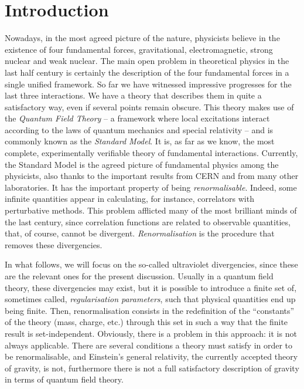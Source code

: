 \documentclass[draft]{phd}
\begin{document}
	\chapter*{Introduction}
		Nowadays, in the most agreed picture of the nature, physicists believe in the existence of four fundamental forces, gravitational, electromagnetic, strong nuclear and weak nuclear. 
		The main open problem in theoretical physics in the last half century is certainly the description of the four fundamental forces in a single unified framework.
		So far we have witnessed impressive progresses for the last three interactions. 
		We have a theory that describes them in quite a satisfactory way, even if several points remain obscure. 
		This theory makes use of the \emph{Quantum Field Theory} -- a framework where local excitations interact according to the laws of quantum mechanics and special relativity -- and is commonly known as the \emph{Standard Model}. 
		It is, as far as we know, the most complete, experimentally verifiable theory of fundamental interactions. 
		Currently, the Standard Model is the agreed picture of fundamental physics among the physicists, also thanks to the important results from \textsc{CERN} and from many other laboratories. 
		It has the important property of being \emph{renormalisable}. 
		Indeed, some infinite quantities appear in calculating, for instance, correlators with perturbative methods. 
		This problem afflicted many of the most brilliant minds of the last century, since correlation functions are related to observable quantities, that, of course, cannot be divergent. 
		\emph{Renormalisation} is the procedure that removes these divergencies.
		
		In what follows, we will focus on the so-called ultraviolet divergencies, since these are the relevant ones for the present discussion.
		Usually in a quantum field theory, these divergencies may exist, but it is possible to introduce a finite set of, sometimes called, \emph{regularisation parameters}, such that physical quantities end up being finite. 
		Then, renormalisation consists in the redefinition of the ``constants'' of the theory (mass, charge, etc.) through this set in such a way that the finite result is set-independent.
		Obviously, there is a problem in this approach: it is not always applicable.
		There are several conditions a theory must satisfy in order to be renormalisable, and Einstein's general relativity, the currently accepted theory of gravity, is not, furthermore there is not a full satisfactory description of gravity in terms of quantum field theory.
 
\end{document}
